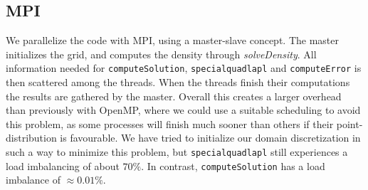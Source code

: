 \documentclass[a4paper,10pt]{article}
\begin{document}
\subsection*{MPI}
We parallelize the code with MPI, using a master-slave concept. The master initializes the grid, and computes the density through \textit{solveDensity}. All information needed for \texttt{computeSolution}, \texttt{specialquadlapl} and \texttt{computeError} is then scattered among the threads. When the threads finish their computations the results are gathered by the master. Overall this creates a larger overhead than previously with OpenMP, where we could use a suitable scheduling to avoid this problem, as some processes will finish much sooner than others if their point-distribution is favourable. We have tried to initialize our domain discretization in such a way to minimize this problem, but \texttt{specialquadlapl} still experiences a load imbalancing of about $70\%$. In contrast, \texttt{computeSolution} has a load imbalance of $\approx0.01\%$. 
\end{document}
